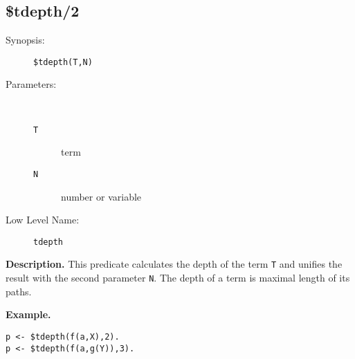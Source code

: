 %
%
%
\subsection{\$tdepth/2}

\begin{description}
\item[Synopsis:]
	{\tt \$tdepth(T,N)}
\item[Parameters:]\ \\[-0.5cm]
	\begin{description}
	\item[{\tt T}] term
	\item[{\tt N}] number or variable
	\end{description}
\item[Low Level Name:]
	{\tt tdepth}
\end{description}

\vspace*{0.5cm}
\noindent
{\bf Description.}
This predicate calculates the depth of the term {\tt T} and
unifies the result with the second parameter {\tt N}.
The depth of a term is maximal length of its paths.

\vspace*{0.5cm}
\noindent
{\bf Example.}
\begin{verbatim}
p <- $tdepth(f(a,X),2).
p <- $tdepth(f(a,g(Y)),3).
\end{verbatim}


